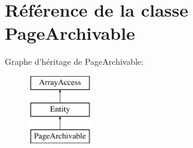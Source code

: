 \hypertarget{class_library_1_1_entities_1_1_page_archivable}{\section{Référence de la classe Page\+Archivable}
\label{class_library_1_1_entities_1_1_page_archivable}
}
Graphe d'héritage de Page\+Archivable\+:\begin{figure}[H]
\begin{center}
\leavevmode
\includegraphics[height=3.000000cm]{class_library_1_1_entities_1_1_page_archivable}
\end{center}
\end{figure}
